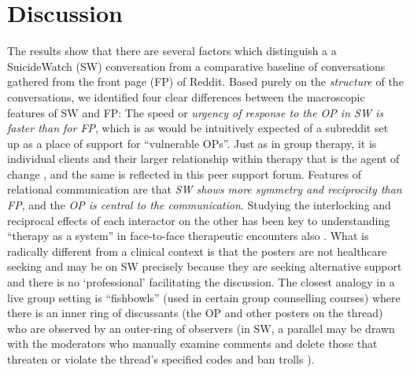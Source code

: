 \section{Discussion}

The results show that there are several factors which distinguish a a SuicideWatch (SW) conversation from a comparative baseline of  conversations gathered from the front page (FP) of Reddit. Based purely on the \textit{ structure} of the conversations, we identified four clear differences between the macroscopic features of SW and FP: 
The speed or \textit{urgency of response to the OP in SW is faster than for FP}, which is as would be intuitively expected of a subreddit set up as a place of support for “vulnerable OPs”.  
Just as in group therapy, it is individual clients and their larger relationship within therapy that is the agent of change \cite{yalom_theory_1995}, and the same is reflected in this peer support forum.   
Features of relational communication \cite{rogers_overview_1983} are that \textit{SW shows more symmetry and reciprocity than FP}, and the \textit{OP is central to the communication}.  Studying the interlocking and reciprocal effects of each interactor on the other has been key to understanding “therapy as a system” in face-to-face therapeutic encounters also \cite{de_shazer_putting_1991}.
What is radically different from a clinical context is that the posters are not healthcare seeking and may be on SW precisely because they are seeking alternative support and there is no ‘professional’ facilitating the discussion.  The closest analogy in a live group setting is “fishbowls” (used in certain group counselling courses) \cite{keim_groupwork_2013} where there is an inner ring of discussants (the OP and other posters on the thread) who are observed by an outer-ring of observers (in SW, a parallel may be drawn with the moderators who manually examine comments and delete those that threaten or violate the thread’s specified codes
and ban trolls 
\cite{choudhury_language_2017}).


